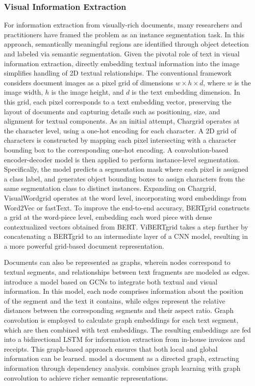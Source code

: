 \subsubsection{Visual Information Extraction} 

For information extraction from visually-rich documents, many researchers and practitioners have framed the problem as an instance segmentation task. In this approach, semantically meaningful regions are identified through object detection and labeled via semantic segmentation. Given the pivotal role of text in visual information extraction, directly embedding textual information into the image simplifies handling of 2D textual relationships. The conventional framework considers document images as a pixel grid of dimensions $w \times h \times d$, where $w$ is the image width, $h$ is the image height, and $d$ is the text embedding dimension. In this grid, each pixel corresponds to a text embedding vector, preserving the layout of documents and capturing details such as positioning, size, and alignment for textual components. As an initial attempt, Chargrid \citep{katti2018chargrid} operates at the character level, using a one-hot encoding for each character. A 2D grid of characters is constructed by mapping each pixel intersecting with a character bounding box to the corresponding one-hot encoding. A convolution-based encoder-decoder model is then applied to perform instance-level segmentation. Specifically, the model predicts a segmentation mask where each pixel is assigned a class label, and generates object bounding boxes to assign characters from the same segmentation class to distinct instances. Expanding on Chargrid, VisualWordgrid \citep{kerroumi2021visualwordgrid} operates at the word level, incorporating word embeddings from Word2Vec or fastText. To improve the end-to-end accuracy, BERTgrid \citep{denk2019bertgrid} constructs a grid at the word-piece level, embedding each word piece with dense contextualized vectors obtained from \ac{BERT}. ViBERTgrid \citep{lin2021vibertgrid} takes a step further by concatenating a BERTgrid to an intermediate layer of a \ac{CNN} model, resulting in a more powerful grid-based document representation. 

Documents can also be represented as graphs, wherein nodes correspond to textual segments, and relationships between text fragments are modeled as edges. \citet{liu2019graph} introduce a model based on \acp{GCN} to integrate both textual and visual information. In this model, each node comprises information about the position of the segment and the text it contains, while edges represent the relative distances between the corresponding segments and their aspect ratio. Graph convolution is employed to calculate graph embeddings for each text segment, which are then combined with text embeddings. The resulting embeddings are fed into a bidirectional \ac{LSTM} for information extraction from in-house invoices and receipts. This graph-based approach ensures that both local and global information can be learned. \citet{hwang2020spatial} model a document as a directed graph, extracting information through dependency analysis. \citet{yu2021pick} combines graph learning with graph convolution to achieve richer semantic representations.

